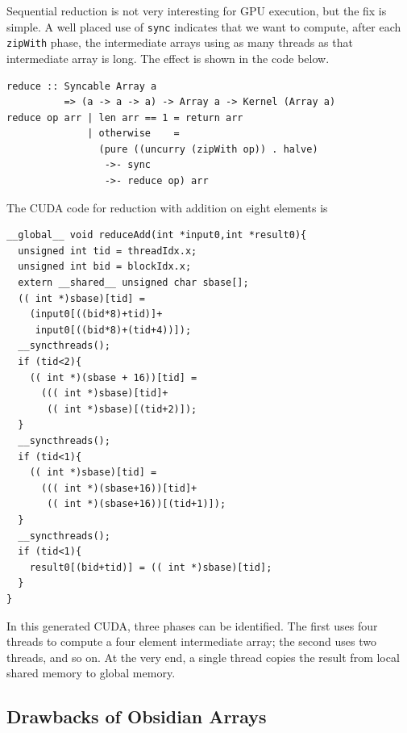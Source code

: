\documentclass[]{sigplanconf}
\begin{document}
Sequential reduction is not very interesting for GPU execution, but 
the fix is simple. A well placed use of {\tt sync} indicates that 
we want to compute, after each {\tt zipWith} phase, the intermediate 
arrays using as many threads as that intermediate array is long. 
The effect is shown in the code below. 
\begin{codesize} 
\begin{verbatim}
reduce :: Syncable Array a 
          => (a -> a -> a) -> Array a -> Kernel (Array a)
reduce op arr | len arr == 1 = return arr
              | otherwise    = 
                (pure ((uncurry (zipWith op)) . halve)
                 ->- sync 
                 ->- reduce op) arr
\end{verbatim}
\end{codesize}
The CUDA code for reduction with addition on eight
elements is
\begin{codesize} 
\begin{verbatim}
__global__ void reduceAdd(int *input0,int *result0){
  unsigned int tid = threadIdx.x;
  unsigned int bid = blockIdx.x;
  extern __shared__ unsigned char sbase[];
  (( int *)sbase)[tid] = 
    (input0[((bid*8)+tid)]+
     input0[((bid*8)+(tid+4))]);
  __syncthreads();
  if (tid<2){
    (( int *)(sbase + 16))[tid] = 
      ((( int *)sbase)[tid]+
       (( int *)sbase)[(tid+2)]);   
  }
  __syncthreads();
  if (tid<1){
    (( int *)sbase)[tid] = 
      ((( int *)(sbase+16))[tid]+
       (( int *)(sbase+16))[(tid+1)]);    
  }
  __syncthreads();
  if (tid<1){
    result0[(bid+tid)] = (( int *)sbase)[tid];  
  }
}
\end{verbatim}
\end{codesize}           
In this generated CUDA, three phases can be identified. 
The first uses four threads to compute a four element intermediate array;
the second uses two threads, and so on. At the very end, a single thread
copies the result from local shared memory to global memory. 

\subsection{Drawbacks of Obsidian Arrays}
\label{sec:Drawbacks}


\end{document}
